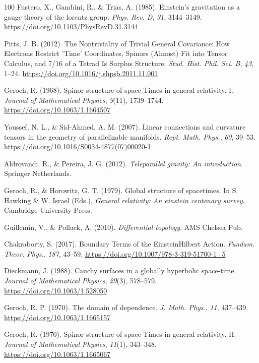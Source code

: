 \documentclass[11pt]{book}
\begin{document}
\begin{thebibliography}{100}
 Fustero, X., Gambini, R., \& Trias, A. (1985). Einstein's gravitation as
a gauge theory of the lorentz group. \emph{Phys. Rev. D}, \emph{31},
3144--3149. \url{https://doi.org/10.1103/PhysRevD.31.3144}

 Pitts, J. B. (2012). The Nontriviality of Trivial General Covariance:
How Electrons Restrict 'Time' Coordinates, Spinors (Almost) Fit into
Tensor Calculus, and 7/16 of a Tetrad Is Surplus Structure. \emph{Stud.
Hist. Phil. Sci. B}, \emph{43}, 1--24.
\url{https://doi.org/10.1016/j.shpsb.2011.11.001}

 Geroch, R. (1968). Spinor structure of space‐Times in general
relativity. I. \emph{Journal of Mathematical Physics}, \emph{9}(11),
1739--1744. \url{https://doi.org/10.1063/1.1664507}

 Youssef, N. L., \& Sid-Ahmed, A. M. (2007). Linear connections and
curvature tensors in the geometry of parallelizable manifolds.
\emph{Rept. Math. Phys.}, \emph{60}, 39--53.
\url{https://doi.org/10.1016/S0034-4877(07)00020-1}

 Aldrovandi, R., \& Pereira, J. G. (2012). \emph{Teleparallel gravity: An
introduction}. Springer Netherlands.

 Geroch, R., \& Horowitz, G. T. (1979). Global structure of spacetimes.
In S. Hawking \& W. Israel (Eds.), \emph{General relativity: An einstein
centenary survey}. Cambridge University Press.

 Guillemin, V., \& Pollack, A. (2010). \emph{Differential topology}. AMS
Chelsea Pub.

 Chakraborty, S. (2017). Boundary Terms of the EinsteinHilbert Action.
\emph{Fundam. Theor. Phys.}, \emph{187}, 43--59.
\url{https://doi.org/10.1007/978-3-319-51700-1_5}

 Dieckmann, J. (1988). Cauchy surfaces in a globally hyperbolic
space‐time. \emph{Journal of Mathematical Physics}, \emph{29}(3),
578--579. \url{https://doi.org/10.1063/1.528050}

 Geroch, R. P. (1970). The domain of dependence. \emph{J. Math. Phys.},
\emph{11}, 437--439. \url{https://doi.org/10.1063/1.1665157}

 Geroch, R. (1970). Spinor structure of space‐Times in general
relativity. II. \emph{Journal of Mathematical Physics}, \emph{11}(1),
343--348. \url{https://doi.org/10.1063/1.1665067}


\end{thebibliography}
\end{document}

